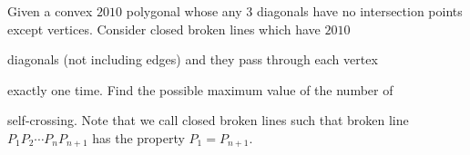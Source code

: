 Given a convex $2010$ polygonal whose any 3 diagonals have no intersection points except vertices. Consider  closed broken lines which have $2010$

 diagonals (not including edges) and they pass through each vertex 

exactly one time. Find the possible maximum value of the number of 

self-crossing. Note that we call closed broken lines such that broken line $P_1P_2\cdots P_nP_{n+1}$ has the property $P_1=P_{n+1}.$